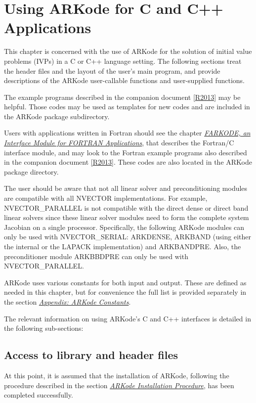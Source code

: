 \documentclass[letterpaper,10pt,english]{sphinxmanual}
\begin{document}
\chapter{Using ARKode for C and C++ Applications}
\label{c_interface/index::doc}\label{c_interface/index:using-arkode-for-c-and-c-applications}\label{c_interface/index:cinterface}
This chapter is concerned with the use of ARKode for the solution
of initial value problems (IVPs) in a C or C++ language setting.  The
following sections treat the header files and the layout of the user's
main program, and provide descriptions of the ARKode user-callable
functions and user-supplied functions.

The example programs described in the companion document {\hyperref[References:r2013]{{[}R2013{]}}} may
be helpful. Those codes may be used as templates for new codes and are
included in the ARKode package  subdirectory.

Users with applications written in Fortran should see the chapter
{\hyperref[f_interface/index:fortraninterface]{\emph{FARKODE, an Interface Module for FORTRAN Applications}}}, that describes the Fortran/C interface
module, and may look to the Fortran example programs also described in
the companion document {\hyperref[References:r2013]{{[}R2013{]}}}.  These codes are also located in the
ARKode package  directory.

The user should be aware that not all linear solver and
preconditioning modules are compatible with all NVECTOR
implementations.  For example, NVECTOR\_PARALLEL is not compatible with
the direct dense or direct band linear solvers since these linear
solver modules need to form the complete system Jacobian on a single
processor.  Specifically, the following ARKode modules can only be
used with NVECTOR\_SERIAL: ARKDENSE, ARKBAND (using either the internal
or the LAPACK implementation) and ARKBANDPRE. Also, the preconditioner
module ARKBBDPRE can only be used with NVECTOR\_PARALLEL.

ARKode uses various constants for both input and output. These are
defined as needed in this chapter, but for convenience the full list
is provided separately in the section {\hyperref[Constants:constants]{\emph{Appendix: ARKode Constants}}}.

The relevant information on using ARKode's C and C++ interfaces is
detailed in the following sub-sections:


\section{Access to library and header files}
\label{c_interface/General:access-to-library-and-header-files}\label{c_interface/General:cinterface-headers}\label{c_interface/General::doc}
At this point, it is assumed that the installation of ARKode,
following the procedure described in the section {\hyperref[Install:installation]{\emph{ARKode Installation Procedure}}},
has been completed successfully.
\end{document}
